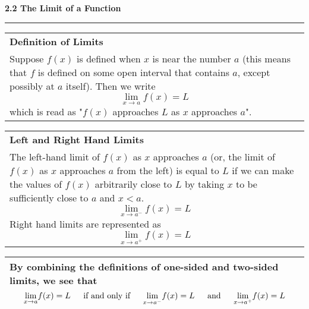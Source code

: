 \documentclass[fleqn]{article}
\begin{document}
\begin{center}
{\begin{tabularx}{.9\textwidth}{|X|}
\hline
\end{tabularx}}
\vspace{12pt}
\pagebreak

\Large\textbf{2.2 The Limit of a Function}

\noindent\hfill\rule{0.3\textwidth}{.4pt}\hfill
\vspace{12pt}

\large
\def\arraystretch{1.3}
{\setlength{\tabcolsep}{16pt}
\begin{tabularx}{.9\textwidth}{|X|}
\hline
	\vspace{1pt}
	\textbf{Definition of Limits} \\[5pt]
	Suppose $f(x)$ is defined when $x$ is near the number $a$ (this means that $f$ is defined on some open interval that contains $a$, except possibly at $a$ itself).  Then we write
	$$\underset{x \to a}{\lim} f(x) = L$$
	which is read as "$f(x)$ approaches $L$ as $x$ approaches $a$".  \\[16pt]
\hline
\end{tabularx}}
\vspace{12pt}

\def\arraystretch{1.3}
{\setlength{\tabcolsep}{16pt}
\begin{tabularx}{.9\textwidth}{|X|}
\hline
	\vspace{1pt}
	\textbf{Left and Right Hand Limits} \\[5pt]
	The left-hand limit of $f(x)$ as $x$ approaches $a$ (or, the limit of $f(x)$ as $x$ approaches $a$ from the left) is equal to $L$ if we can make the values of $f(x)$ arbitrarily close to $L$ by taking $x$ to be sufficiently close to $a$ and $x < a$.
	$$\underset{x \to a^-}{\lim} f(x) = L$$
	Right hand limits are represented as
	$$\underset{x \to a^+}{\lim} f(x) = L$$ \\
\hline
\end{tabularx}}
\vspace{12pt}

\def\arraystretch{1.3}
{\setlength{\tabcolsep}{16pt}
\begin{tabularx}{.9\textwidth}{|X|}
\hline
	\vspace{1pt}
	By combining the definitions of one-sided and two-sided limits, we see that
	$$\underset{x \to a}{\lim} f(x) = L \text{\hspace{12pt} if and only if \hspace{12pt}} \underset{x \to a^-}{\lim} f(x) = L \text{\hspace{12pt} and \hspace{12pt}} \underset{x \to a^+}{\lim} f(x) = L$$ \\
\hline
\end{tabularx}}
\vspace{12pt}


\end{center}
\end{document}
